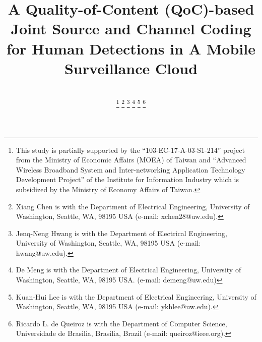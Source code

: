 \documentclass[journal]{IEEEtran}
\begin{document}
%
\title{A Quality-of-Content (QoC)-based Joint Source and Channel Coding for Human Detections in A Mobile Surveillance Cloud
}


\author{   \\
\thanks{This study is partially supported by the “103-EC-17-A-03-S1-214” project from the Ministry of Economic Affairs (MOEA) of Taiwan and “Advanced Wireless Broadband System and Inter-networking Application Technology Development Project” of the Institute for Information Industry which is subsidized by the Ministry of Economy Affairs of Taiwan.}
\thanks{Xiang Chen is with the Department
of Electrical Engineering, University of Washington, Seattle,
WA, 98195 USA (e-mail: xchen28@uw.edu).}%
\thanks{Jenq-Neng Hwang is with the Department
of Electrical Engineering, University of Washington, Seattle,
WA, 98195 USA (e-mail: hwang@uw.edu).}%
\thanks{De Meng is with the Department
of Electrical Engineering, University of Washington, Seattle,
WA, 98195 USA. (e-mail: demeng@uw.edu)}%
\thanks{Kuan-Hui Lee is with the Department
of Electrical Engineering, University of Washington, Seattle,
WA, 98195 USA (e-mail: ykhlee@uw.edu).}
\thanks{Ricardo L. de Queiroz is with the Department
of Computer Science, Universidade de Brasilia, Brasilia, Brazil (e-mail: queiroz@ieee.org).}

}

\maketitle
\end{document}
